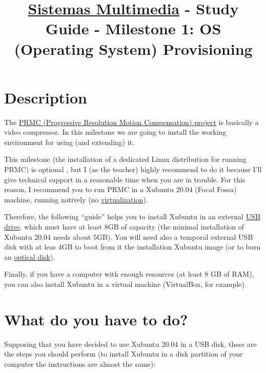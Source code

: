 \title{\href{http://cms.ual.es/UAL/estudios/masteres/plandeestudios/asignaturas/asignatura/MASTER7114?idAss=71142105&idTit=7114}{Sistemas Multimedia} - Study Guide - Milestone 1: OS (Operating System) Provisioning}

\maketitle

\section{Description}

The \href{https://github.com/Sistemas-Multimedia/PRMC/}{PRMC
  (Progressive Resolution Motion Compensation) project} is basically a
video compressor. In this milestone we are going to install the
working environment for using (and extending) it.

This milestone (the installation of a dedicated Linux distribution for
running PRMC) is optional , but I (as the teacher) highly
recommend to do it because I'll give technical support in a reasonable
time when you are in trouble. For this reason, I recommend you to run
PRMC in a Xubuntu 20.04 (Focal Fossa) \cite{xubuntu} machine,
running natively
(no \href{https://en.wikipedia.org/wiki/Virtualization}{virtualization}).

Therefore, the following ``guide'' helps you to install Xubuntu in an
external \href{https://en.wikipedia.org/wiki/USB_flash_drive}{USB
drive}, which must have at least 8GB of capacity (the minimal
installation of Xubuntu 20.04 needs about 5GB). You will need also a
temporal external USB disk with at leas 4GB to boot from it the
installation Xubuntu image (or to burn
an \href{https://en.wikipedia.org/wiki/Optical_disc}{optical disk}).

Finally, if you have a computer with enough resources (at least 8 GB
of RAM), you can also install Xubuntu in a virtual machine
(VirtualBox, for example).

\section{What do you have to do?}

Supposing that you have decided to use Xubuntu 20.04 in a USB disk,
these are the steps you should perform (to install Xubuntu in a disk
partition of your computer the instructions are almost the same):

